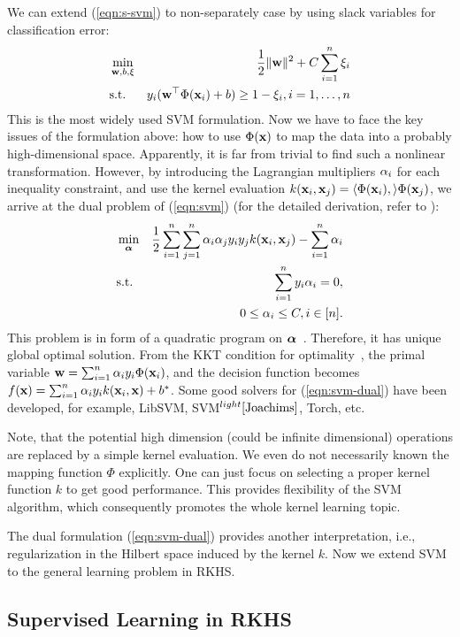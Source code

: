 We can extend (\ref{eqn:s-svm}) to non-separately case by using slack variables for classification error:
\begin{eqnarray}
&\min_{\mathbf w,b,\xi}&\frac{1}{2}\|\mathbf w\|^2+C\sum_{i=1}^n\xi_i \label{eqn:svm}\\
&\mbox{s.t.}& y_i(\mathbf w^\top\Phi(\x_i)+b)\geq 1-\xi_i,i=1,\ldots,n\nonumber
\end{eqnarray}
This is the most widely used SVM formulation. Now we have to face the key issues of the formulation above: how to use $\Phi(\mathbf{x})$ to map the data into a probably high-dimensional space. Apparently, it is far from trivial to find such a nonlinear transformation. However, by introducing the Lagrangian multipliers ${\alpha}_i$ for each inequality constraint, and use the kernel evaluation $k(\mathbf{x}_i,\mathbf{x}_j)=\langle\Phi(\mathbf{x}_i),\rangle\Phi(\mathbf{x}_j)$, we arrive at the dual problem of (\ref{eqn:svm}) (for the detailed derivation, refer to \cite{datamine/Burges98}):
\begin{eqnarray}
&\min_{\ba}& \frac{1}{2}\sum_{i=1}^n\sum_{j=1}^n\a_i\a_jy_iy_jk(\x_i,\x_j)-\sum_{i=1}^n\a_i \label{eqn:svm-dual}\\
&\mbox{s.t.}& \sum_{i=1}^ny_i\a_i=0,\nonumber\\
&& 0\leq\a_i\leq C, i\in[n].
\end{eqnarray}
This problem is in form of a quadratic program on ${\boldsymbol{\alpha}}$~\cite{Boyd}. Therefore, it has unique global optimal solution. From the KKT condition for optimality~\cite{Boyd}, the primal variable $\mathbf w=\sum_{i=1}^n{\alpha}_iy_i\Phi(\mathbf{x}_i)$, and the decision function becomes $f(\mathbf{x})=\sum_{i=1}^n{\alpha}_iy_ik(\mathbf{x}_i,\mathbf{x})+b^*$. Some good solvers for (\ref{eqn:svm-dual}) have been developed, for example, LibSVM\cite{tist/cl01}, SVM$^{light}\cite{Joachims}$, Torch\cite{tr/CollobertBM}, etc.

Note, that the potential high dimension (could be infinite dimensional) operations are replaced by a simple kernel evaluation. We even do not necessarily known the mapping function $\Phi$ explicitly. One can just focus on selecting a proper kernel function $k$ to get good performance. This provides flexibility of the SVM algorithm, which consequently promotes the whole kernel learning topic.

The dual formulation (\ref{eqn:svm-dual}) provides another interpretation, i.e., regularization in the Hilbert space induced by the kernel $k$. Now we extend SVM to the general learning problem in RKHS.

\subsection{Supervised Learning in RKHS}

